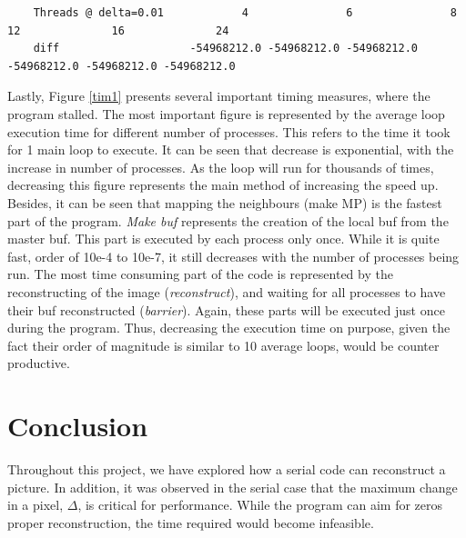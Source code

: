 \documentclass[11pt]{article}
\begin{document}
	\begin{lstlisting}
	Threads @ delta=0.01 			4 				6 				8 				12 				16 				24 
	diff					-54968212.0	-54968212.0	-54968212.0	-54968212.0	-54968212.0	-54968212.0
	\end{lstlisting}
	
	Lastly, Figure \ref{tim1} presents several important timing measures, where the program stalled. The most important figure is represented by the average loop execution time for different number of processes. This refers to the time it took for 1 main loop to execute. It can be seen that decrease is exponential, with the increase in number of processes. As the loop will run for thousands of times, decreasing this figure represents the main method of increasing the speed up. Besides, it can be seen that mapping the neighbours (make MP) is the fastest part of the program. \textit{Make buf} represents the creation of the local buf from the master buf. This part is executed by each process only once. While it is quite fast, order of 10e-4 to 10e-7, it still decreases with the number of processes being run. The most time consuming part of the code is represented by the reconstructing of the image (\textit{reconstruct}), and waiting for all processes to have their buf reconstructed (\textit{barrier}). Again, these parts will be executed just once during the program. Thus, decreasing the execution time on purpose, given the fact their order of magnitude is similar to 10 average loops, would be counter productive. 
	
		
	\section{Conclusion}
	Throughout this project, we have explored how a serial code can reconstruct a picture. In addition, it was observed in the serial case that the maximum change in a pixel, $\Delta$, is critical for performance. While the program can aim for zeros proper reconstruction, the time required would become infeasible. 
	
\end{document}
